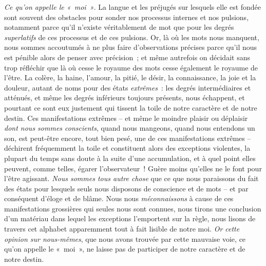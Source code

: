 {\textit{Ce qu'on appelle
le «~moi~»}. La langue et les préjugés sur lesquels elle est fondée
sont souvent des obstacles pour sonder nos processus internes et nos
pulsions, notamment parce qu'il n'existe véritablement de mot que
pour les degrés \textit{superlatifs} de ces processus et de ces
pulsions. Or, là où les mots nous manquent, nous sommes accoutumés à
ne plus faire d'observations précises parce qu'il nous est pénible
alors de penser avec précision~; et même autrefois on décidait sans
trop réfléchir que là où cesse le royaume des mots cesse également le
royaume de l'être. La colère, la haine, l'amour, la pitié, le désir,
la connaissance, la joie et la douleur, autant de noms pour des états
\textit{extrêmes}~: les degrés intermédiaires et atténués, et même
les degrés inférieurs toujours présents, nous échappent, et pourtant
ce sont eux justement qui tissent la toile de notre caractère et de
notre destin. Ces manifestations extrêmes – et même le moindre
plaisir ou déplaisir \textit{dont nous sommes conscients}, quand nous
mangeons, quand nous entendons un son, est peut-être encore, tout
bien pesé, une de ces manifestations extrêmes – déchirent fréquemment
la toile et constituent alors des exceptions violentes, la plupart du
temps sans doute à la suite d'une accumulation, et à quel point elles
peuvent, comme telles, égarer l'observateur~! Guère moins qu'elles ne
le font pour l'être agissant. \textit{Nous sommes tous autre chose}
que ce que nous paraissons du fait des états pour lesquels seuls nous
disposons de conscience et de mots – et par conséquent d'éloge et de
blâme. Nous nous \textit{méconnaissons} à cause de ces manifestations
grossières qui seules nous sont connues, nous tirons une conclusion
d'un matériau dans lequel les exceptions l'emportent sur la règle,
nous lisons de travers cet alphabet apparemment tout à fait lisible
de notre moi. \textit{Or cette opinion sur nous-mêmes}, que nous
avons trouvée par cette mauvaise voie, ce qu'on appelle le «~moi~»,
ne laisse pas de participer de notre caractère et de notre destin.
}

